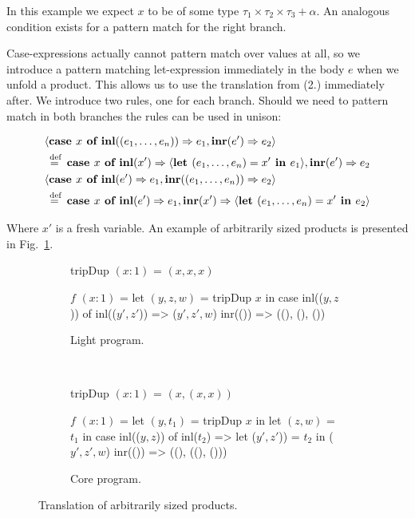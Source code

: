 \begin{enumerate}
    In this example we expect $x$ to be of some type $\tau_1 \times \tau_2
    \times \tau_3 + \alpha$. An analogous condition exists for a pattern match
    for the right branch.

    Case-expressions actually cannot pattern match over values at all, so we
    introduce a pattern matching let-expression immediately in the body $e$
    when we unfold a product. This allows us to use the translation from (2.)
    immediately after. We introduce two rules, one for each branch. Should we
    need to pattern match in both branches the rules can be used in unison:

    \begin{align*}
      &\langle \textbf{case } x \textbf{ of } \textbf{inl}((e_1, \dots, e_n)) \Rightarrow e_1, \textbf{inr}(e') \Rightarrow e_2 \rangle \\
      &\stackrel{\>\text{def}}{=}\> \textbf{case } x \textbf{ of } \textbf{inl}(x') \Rightarrow \langle \textbf{let } (e_1, \dots, e_n) = x' \textbf{ in } e_1 \rangle, \textbf{inr}(e') \Rightarrow e_2 \\
      &\langle \textbf{case } x \textbf{ of } \textbf{inl}(e') \Rightarrow e_1, \textbf{inr}((e_1, \dots, e_n)) \Rightarrow e_2 \rangle \\
      &\stackrel{\>\text{def}}{=}\> \textbf{case } x \textbf{ of } \textbf{inl}(e') \Rightarrow e_1, \textbf{inr}(x') \Rightarrow \langle \textbf{let } (e_1, \dots, e_n) = x' \textbf{ in } e_2 \rangle \\
    \end{align*}

\end{enumerate}

Where $x'$ is a fresh variable. An example of arbitrarily sized products is
presented in Fig.~\ref{fig:products_translation}.

\begin{figure}[ht!]
  \centering
  \begin{subfigure}[b]{0.90\textwidth}
    \begin{rfuncodenum}
tripDup $(x: 1)$ = $(x, x, x)$

$f$ $(x: 1)$ = let $(y, z, w)$ = tripDup $x$
           in case inl(($y, z$)) of
              inl(($y', z'$)) => ($y', z', w$)
              inr(()) => ((), (), ())
    \end{rfuncodenum}
    \caption{Light program.}
  \end{subfigure}
  ~
  \begin{subfigure}[b]{0.90\textwidth}
    \begin{rfuncodenum}
tripDup $(x: 1)$ = $(x, (x, x))$

$f$ $(x: 1)$ = let $(y, t_1)$ = tripDup $x$
            in let $(z, w)$ = $t_1$
               in case inl(($y, z$)) of
                 inl($t_2$) => let ($y', z'$)) = $t_2$ in ($y', z', w$)
                 inr(()) => ((), ((), ()))
    \end{rfuncodenum}
    \caption{Core program.}
  \end{subfigure}
  \caption{Translation of arbitrarily sized products.}\label{fig:products_translation}
\end{figure}

